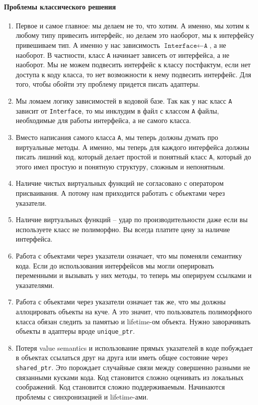 \paragraph{Проблемы классического решения}
\begin{enumerate}
\item Первое и самое главное: мы делаем не то, что хотим.
А именно, мы хотим к любому типу привесить интерфейс, но делаем это наоборот, мы к интерфейсу привешиваем тип.
А именно у нас зависимость $\texttt{Interface}\leftarrow\texttt{A}$, а не наоборот.
В частности, класс \texttt{A} начинает зависеть от интерфейса, а не наоборот.
Мы не можем подвесить интерфейс к классу постфактум, если нет доступа к коду класса, то нет возможности к нему подвесить интерфейс.
Для того, чтобы обойти эту проблему придется писать адаптеры.

\item Мы ломаем логику зависимостей в кодовой базе.
Так как у нас класс \texttt{A} зависит от \texttt{Interface}, то мы инклудим в файл с классом \texttt{A} файлы, необходимые для работы интерфейса, а не самого класса.

\item Вместо написания самого класса \texttt{A}, мы теперь должны думать про виртуальные методы.
А именно, мы теперь для каждого интерфейса должны писать лишний код, который делает простой и понятный класс \texttt{A}, который до этого имел простую и понятную структуру, сложным и непонятным.

\item Наличие чистых виртуальных функций не согласовано с оператором присваивания.
А потому нам приходится работать с объектами через указатели.

\item Наличие виртуальных функций -- удар по производительности даже если вы используете класс не полиморфно.
Вы всегда платите цену за наличие интерфейса.

\item Работа с объектами через указатели означает, что мы поменяли семантику кода.
Если до использования интерфейсов мы могли оперировать переменными и вызывать у них методы, то теперь мы оперируем ссылками и указателями.

\item Работа с объектами через указатели означает так же, что мы должны аллоцировать объекты на куче.
А это значит, что пользователь полиморфного класса обязан следить за памятью и lifetime-ом объекта.
Нужно заворачивать объекты в адаптеры вроде \texttt{unique\_ptr}.

\item Потеря value semantics и использование прямых указателей в коде побуждает в объектах ссылаться друг на друга или иметь общее состояние через \texttt{shared\_ptr}.
Это порождает случайные связи между совершенно разными не связанными кусками кода.
Код становится сложно оценивать из локальных соображений.
Код становится сложно поддерживаемым.
Начинаются проблемы с синхронизацией и lifetime-ами.
\end{enumerate}

